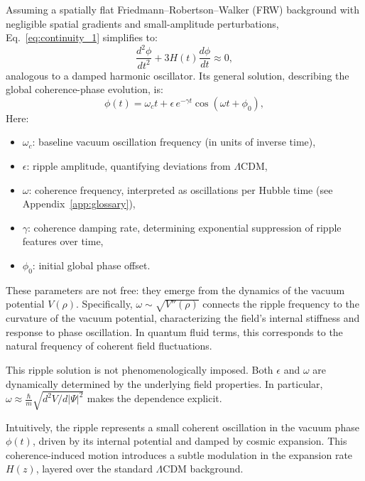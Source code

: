 Assuming a spatially flat Friedmann–Robertson–Walker (FRW) background with negligible spatial gradients and small-amplitude perturbations, Eq.~\eqref{eq:continuity_1} simplifies to:
\begin{equation}
\frac{d^2\phi}{dt^2} + 3H(t)\frac{d\phi}{dt} \approx 0,
\label{eq:phase_damping}
\end{equation}
analogous to a damped harmonic oscillator. Its general solution, describing the global coherence-phase evolution, is:
\begin{equation}
\phi(t) = \omega_c t + \epsilon\, e^{-\gamma t}\cos(\omega t + \phi_0),
\label{eq:phi_solution}
\end{equation}
Here:
\begin{itemize}[leftmargin=*]
    \item \( \omega_c \): baseline vacuum oscillation frequency (in units of inverse time),
    \item \( \epsilon \): ripple amplitude, quantifying deviations from \(\Lambda\)CDM,
    \item \( \omega \): coherence frequency, interpreted as oscillations per Hubble time (see Appendix~\ref{app:glossary}),
    \item \( \gamma \): coherence damping rate, determining exponential suppression of ripple features over time,
    \item \( \phi_0 \): initial global phase offset.
\end{itemize}

These parameters are not free: they emerge from the dynamics of the vacuum potential \( V(\rho) \). Specifically, \( \omega \sim \sqrt{V''(\rho)} \) connects the ripple frequency to the curvature of the vacuum potential, characterizing the field’s internal stiffness and response to phase oscillation. In quantum fluid terms, this corresponds to the natural frequency of coherent field fluctuations.

This ripple solution is not phenomenologically imposed. Both \( \epsilon \) and \( \omega \) are dynamically determined by the underlying field properties. In particular, \( \omega \approx \frac{\hbar}{m}\sqrt{d^2V/d|\Psi|^2} \) makes the dependence explicit.

Intuitively, the ripple represents a small coherent oscillation in the vacuum phase \( \phi(t) \), driven by its internal potential and damped by cosmic expansion. This coherence-induced motion introduces a subtle modulation in the expansion rate \( H(z) \), layered over the standard \(\Lambda\)CDM background.

